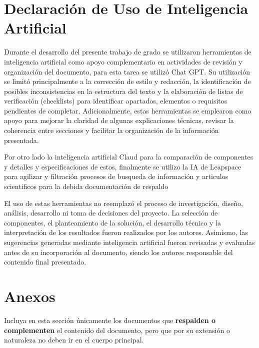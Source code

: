 \documentclass[11pt]{article}
\begin{document}
\newpage
\section{Declaración de Uso de Inteligencia Artificial}

Durante el desarrollo del presente trabajo de grado se utilizaron herramientas de inteligencia artificial como apoyo complementario en actividades de revisión y organización del documento, para esta tarea se utilizó Chat GPT. Su utilización se limitó principalmente a la corrección de estilo y redacción, la identificación de posibles inconsistencias en la estructura del texto y la elaboración de listas de verificación (checklists) para identificar apartados, elementos o requisitos pendientes de completar. Adicionalmente, estas herramientas se emplearon como apoyo para mejorar la claridad de algunas explicaciones técnicas, revisar la coherencia entre secciones y facilitar la organización de la información presentada.

Por otro lado la inteligencia artificial Claud para la comparación de componentes y detalles y especificaciones de estos, finalmente se utilizo la IA de Leapspace para agilizar y filtración procesos de busqueda de información y articulos scientificos para la debida documentación de respaldo

El uso de estas herramientas no reemplazó el proceso de investigación, diseño, análisis, desarrollo ni toma de decisiones del proyecto. La selección de componentes, el planteamiento de la solución, el desarrollo técnico y la interpretación de los resultados fueron realizados por los autores. Asimismo, las sugerencias generadas mediante inteligencia artificial fueron revisadas y evaluadas antes de su incorporación al documento, siendo los autores responsable del contenido final presentado.


\newpage
\nocite{*}

\begingroup
\renewcommand*{\bibfont}{\fontsize{8}{10}\selectfont}
\printbibliography
\endgroup
{}


\newpage
\section{Anexos}
Incluya en esta sección únicamente los documentos que \textbf{respalden o complementen} el contenido del documento, pero que por su extensión o naturaleza no deben ir en el cuerpo principal. 
\end{document}

